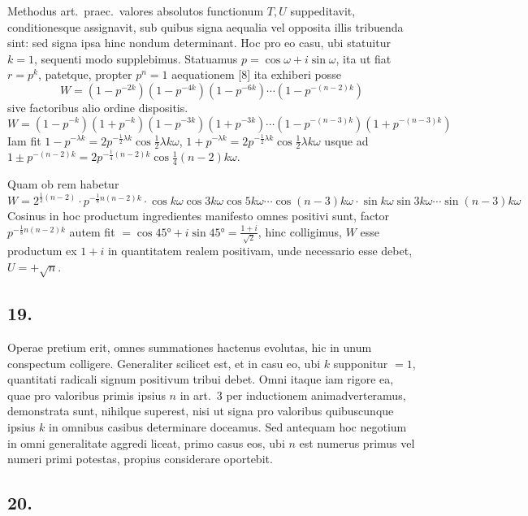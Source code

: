 \documentclass[12pt,a4paper]{article}
\theoremstyle{plain}
\begin{document}
Methodus art.\ praec.\ valores absolutos functionum $T, U$ suppeditavit, conditionesque assignavit, sub quibus signa aequalia vel opposita illis tribuenda sint: sed signa ipsa hinc nondum determinant. Hoc pro eo casu, ubi statuitur $k = 1$, sequenti modo supplebimus. Statuamus $p = \cos \omega + i \sin \omega$, ita ut fiat $r = p^k$, patetque, propter $p^n = 1$ aequationem [8] ita exhiberi posse
\[
W = (1-p^{-2k})(1-p^{-4k})(1-p^{-6k}) \cdots (1-p^{-(n-2)k})
\]
sive factoribus alio ordine dispositis.
\[
W = (1-p^{-k})(1+p^{-k})(1-p^{-3k})(1+p^{-3k}) \cdots (1-p^{-(n-3)k})(1+p^{-(n-3)k})
\]
Iam fit $1 - p^{-\lambda k} = 2p^{-\frac{1}{2}\lambda k} \cos \tfrac{1}{2}\lambda k \omega$, $1 + p^{-\lambda k} = 2p^{-\frac{1}{2}\lambda k} \cos \tfrac{1}{2}\lambda k \omega$ usque ad $1 \pm p^{-(n-2)k} = 2p^{-\frac{1}{4}(n-2)k} \cos \tfrac{1}{4}(n-2)k\omega$.

Quam ob rem habetur
\[
W = 2^{\frac{1}{2}(n-2)} \cdot p^{-\frac{1}{8}n(n-2)k} \cdot \cos k\omega \cos 3k\omega \cos 5k\omega \cdots \cos (n-3)k\omega \cdot \sin k\omega \sin 3k\omega \cdots \sin (n-3)k\omega
\]
Cosinus in hoc productum ingredientes manifesto omnes positivi sunt, factor $p^{-\frac{1}{8}n(n-2)k}$ autem fit $= \cos 45° + i\sin 45° = \frac{1+i}{\sqrt{2}}$, hinc colligimus, $W$ esse productum ex $1+i$ in quantitatem realem positivam, unde necessario esse debet, $U = +\sqrt{n}$.

\subsection*{19.}

Operae pretium erit, omnes summationes hactenus evolutas, hic in unum conspectum colligere. Generaliter scilicet est, et in casu eo, ubi $k$ supponitur $= 1$, quantitati radicali signum positivum tribui debet. Omni itaque iam rigore ea, quae pro valoribus primis ipsius $n$ in art.\ 3 per inductionem animadverteramus, demonstrata sunt, nihilque superest, nisi ut signa pro valoribus quibuscunque ipsius $k$ in omnibus casibus determinare doceamus. Sed antequam hoc negotium in omni generalitate aggredi liceat, primo casus eos, ubi $n$ est numerus primus vel numeri primi potestas, propius considerare oportebit.

\subsection*{20.}
\end{document}
